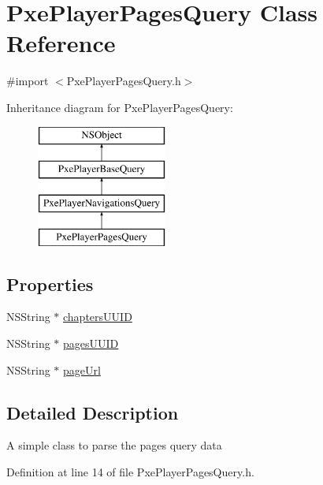 \hypertarget{interface_pxe_player_pages_query}{\section{Pxe\-Player\-Pages\-Query Class Reference}
\label{interface_pxe_player_pages_query}
}


{\ttfamily \#import $<$Pxe\-Player\-Pages\-Query.\-h$>$}

Inheritance diagram for Pxe\-Player\-Pages\-Query\-:\begin{figure}[H]
\begin{center}
\leavevmode
\includegraphics[height=4.000000cm]{interface_pxe_player_pages_query}
\end{center}
\end{figure}
\subsection*{Properties}
\begin{DoxyCompactItemize}
\item 
N\-S\-String $\ast$ \hyperlink{interface_pxe_player_pages_query_a4c1b814264358230513c88452cb38988}{chapters\-U\-U\-I\-D}
\item 
N\-S\-String $\ast$ \hyperlink{interface_pxe_player_pages_query_ad71c0d1369eccd8cde9d71afe70d6990}{pages\-U\-U\-I\-D}
\item 
N\-S\-String $\ast$ \hyperlink{interface_pxe_player_pages_query_ad20152232423918df95d9c737139c545}{page\-Url}
\end{DoxyCompactItemize}


\subsection{Detailed Description}
A simple class to parse the pages query data 

Definition at line 14 of file Pxe\-Player\-Pages\-Query.\-h.



